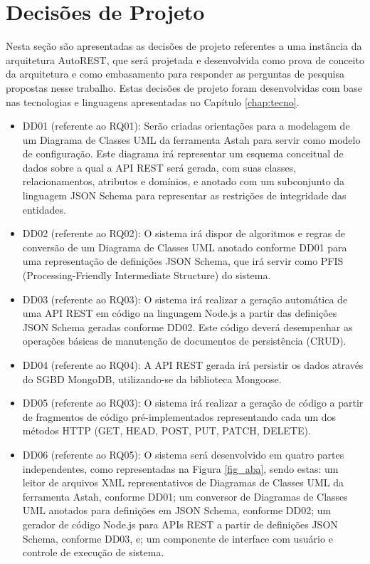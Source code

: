 
\section{Decisões de Projeto}
\label{sec:dds}

Nesta seção são apresentadas as decisões de projeto referentes a uma instância da arquitetura AutoREST, que será projetada e desenvolvida como prova de conceito da arquitetura e como embasamento para responder as perguntas de pesquisa propostas nesse trabalho. Estas decisões de projeto foram desenvolvidas com base nas tecnologias e linguagens apresentadas no Capítulo \ref{chap:tecno}.

\begin{itemize}
    \item DD01 (referente ao RQ01): Serão criadas orientações para a modelagem de um Diagrama de Classes UML da ferramenta Astah para servir como modelo de configuração. Este diagrama irá representar um esquema conceitual de dados sobre a qual a API REST será gerada, com suas classes, relacionamentos, atributos e domínios, e anotado com um subconjunto da linguagem JSON Schema para representar as restrições de integridade das entidades.
    \item DD02 (referente ao RQ02): O sistema irá dispor de algoritmos e regras de conversão de um Diagrama de Classes UML anotado conforme DD01 para uma representação de definições JSON Schema, que irá servir como PFIS (Processing-Friendly Intermediate Structure) do sistema.
    \item DD03 (referente ao RQ03): O sistema irá realizar a geração automática de uma API REST em código na linguagem Node.js a partir das definições JSON Schema geradas conforme DD02. Este código deverá desempenhar as operações básicas de manutenção de documentos de persistência (CRUD).
    \item DD04 (referente ao RQ04): A API REST gerada irá persistir os dados através do SGBD MongoDB, utilizando-se da biblioteca Mongoose.
    \item DD05 (referente ao RQ03): O sistema irá realizar a geração de código a partir de fragmentos de código pré-implementados representando cada um dos métodos HTTP (GET, HEAD, POST, PUT, PATCH, DELETE).
    \item DD06 (referente ao RQ05): O sistema será desenvolvido em quatro partes independentes, como representadas na Figura \ref{fig_aba}, sendo estas: um leitor de arquivos XML representativos de Diagramas de Classes UML da ferramenta Astah, conforme DD01; um conversor de Diagramas de Classes UML anotados para definições em JSON Schema, conforme DD02; um gerador de código Node.js para APIs REST a partir de definições JSON Schema, conforme DD03, e; um componente de interface com usuário e controle de execução de sistema.
\end{itemize}

